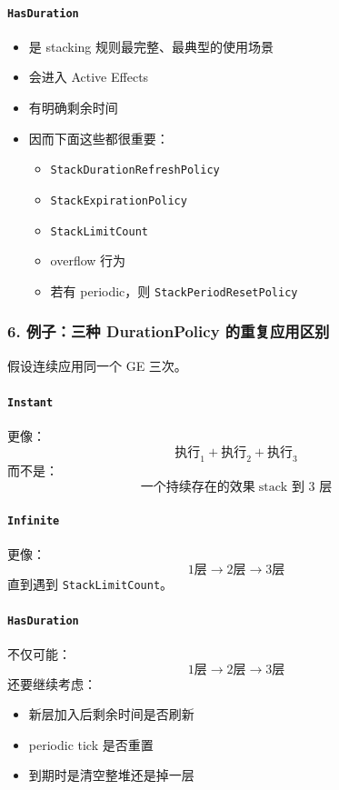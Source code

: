 \documentclass[CJKmath=true,10pt]{MyBook}
\begin{document}
\paragraph{\texttt{HasDuration}}
\begin{itemize}
	\item 是 stacking 规则最完整、最典型的使用场景
	\item 会进入 Active Effects
	\item 有明确剩余时间
	\item 因而下面这些都很重要：
	\begin{itemize}
		\item \texttt{StackDurationRefreshPolicy}
		\item \texttt{StackExpirationPolicy}
		\item \texttt{StackLimitCount}
		\item overflow 行为
		\item 若有 periodic，则 \texttt{StackPeriodResetPolicy}
	\end{itemize}
\end{itemize}

\subsubsection{6. 例子：三种 DurationPolicy 的重复应用区别}

假设连续应用同一个 GE 三次。

\paragraph{\texttt{Instant}}
更像：
\[
\text{执行}_1 + \text{执行}_2 + \text{执行}_3
\]
而不是：
\[
\text{一个持续存在的效果} \; \text{stack 到 3 层}
\]

\paragraph{\texttt{Infinite}}
更像：
\[
1 \text{层} \rightarrow 2 \text{层} \rightarrow 3 \text{层}
\]
直到遇到 \texttt{StackLimitCount}。

\paragraph{\texttt{HasDuration}}
不仅可能：
\[
1 \text{层} \rightarrow 2 \text{层} \rightarrow 3 \text{层}
\]
还要继续考虑：
\begin{itemize}
	\item 新层加入后剩余时间是否刷新
	\item periodic tick 是否重置
	\item 到期时是清空整堆还是掉一层
\end{itemize}
\end{document}
